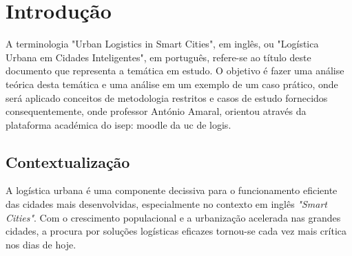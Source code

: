 
\chapter{Introdução} 	%
\label{Chapter1} 		%




A terminologia "Urban Logistics in Smart Cities", em inglês, ou "Logística Urbana em Cidades Inteligentes", em português, refere-se ao título deste documento  que representa a temática em estudo.
O objetivo é fazer uma análise teórica desta temática e uma análise em um exemplo de um caso prático, onde será aplicado conceitos de metodologia restritos e casos de estudo fornecidos consequentemente,  onde professor António Amaral, orientou através da plataforma académica do \gls{isep}: \gls{moodle} da \gls{uc} de \gls{logis}\cite{MoodleEnunciado}.

\section{Contextualização}
\label{sec:contextualizacao	}

A logística urbana é uma componente decissiva para o funcionamento eficiente das cidades mais desenvolvidas, especialmente no contexto em inglês \textit{"Smart Cities"}.
Com o crescimento populacional e a urbanização acelerada nas grandes cidades, a procura por soluções logísticas eficazes tornou-se cada vez mais crítica nos dias de hoje.

